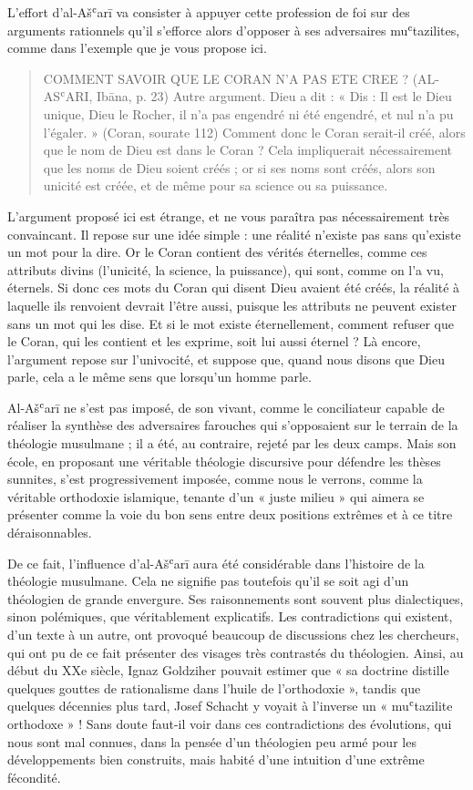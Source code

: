 L'effort d'al-Ašʿarī va consister à appuyer cette profession de foi sur
des arguments rationnels qu'il s'efforce alors d'opposer à ses
adversaires muʿtazilites, comme dans l'exemple que je vous propose ici.
\begin{quote}
    COMMENT SAVOIR QUE LE CORAN N’A PAS ETE CREE ? (AL-ASʿARI, Ibāna, p. 23)
Autre argument. Dieu a dit : « Dis : Il est le Dieu unique, Dieu le Rocher, il n’a pas engendré ni été engendré, et nul n’a pu l’égaler. » (Coran, sourate 112) Comment donc le Coran serait-il créé, alors que le nom de Dieu est dans le Coran ? Cela impliquerait nécessairement que les noms de Dieu soient créés ; or si ses noms sont créés, alors son unicité est créée, et de même pour sa science ou sa puissance.
\end{quote}


L'argument proposé ici est étrange, et ne vous paraîtra pas
nécessairement très convaincant. Il repose sur une idée simple : une
réalité n'existe pas sans qu'existe un mot pour la dire. Or le Coran
contient des vérités éternelles, comme ces attributs divins (l'unicité,
la science, la puissance), qui sont, comme on l'a vu, éternels. Si donc
ces mots du Coran qui disent Dieu avaient été créés, la réalité à
laquelle ils renvoient devrait l'être aussi, puisque les attributs ne
peuvent exister sans un mot qui les dise. Et si le mot existe
éternellement, comment refuser que le Coran, qui les contient et les
exprime, soit lui aussi éternel ? Là encore, l'argument repose sur
l'univocité, et suppose que, quand nous disons que Dieu parle, cela a le
même sens que lorsqu'un homme parle.

Al-Ašʿarī ne s'est pas imposé, de son vivant, comme le conciliateur
capable de réaliser la synthèse des adversaires farouches qui
s'opposaient sur le terrain de la théologie musulmane ; il a été, au
contraire, rejeté par les deux camps. Mais son école, en proposant une
véritable théologie discursive pour défendre les thèses sunnites, s'est
progressivement imposée, comme nous le verrons, comme la véritable
orthodoxie islamique, tenante d'un
« juste milieu » qui aimera se présenter comme la voie du bon sens entre
deux positions extrêmes et à ce titre déraisonnables.

De ce fait, l'influence d'al-Ašʿarī aura été considérable dans
l'histoire de la théologie musulmane. Cela ne signifie pas toutefois
qu'il se soit agi d'un théologien de grande envergure. Ses raisonnements
sont souvent plus dialectiques, sinon polémiques, que
véritablement explicatifs. Les contradictions qui existent, d'un texte à
un autre, ont provoqué beaucoup de discussions chez les chercheurs, qui
ont pu de ce fait présenter des visages très contrastés du théologien.
Ainsi, au début du XXe siècle, Ignaz Goldziher pouvait estimer que
« sa doctrine distille quelques gouttes de rationalisme dans l'huile de
l'orthodoxie », tandis que quelques décennies plus tard, Josef Schacht y
voyait à l'inverse un « muʿtazilite orthodoxe » ! Sans doute faut-il
voir dans ces contradictions des évolutions, qui nous sont mal connues,
dans la pensée d'un théologien peu armé pour les développements bien
construits, mais habité d'une intuition d'une extrême fécondité.


